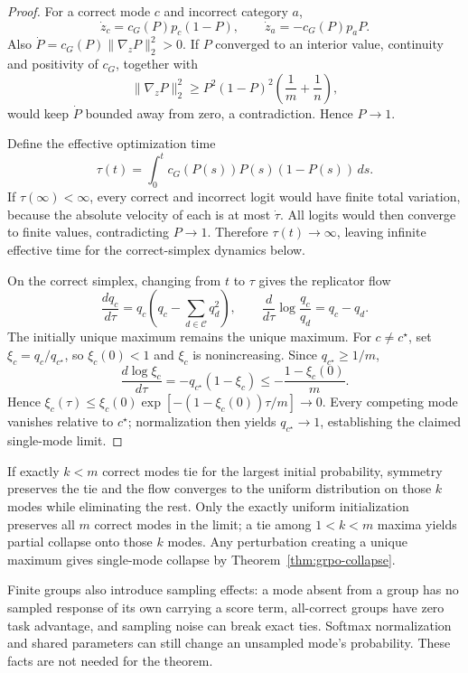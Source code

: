 \begin{proof}
For a correct mode $c$ and incorrect category $a$,
\[
  \dot z_c=c_G(P)p_c(1-P),
  \qquad
  \dot z_a=-c_G(P)p_aP.
\]
Also $\dot P=c_G(P)\lVert\nabla_zP\rVert_2^2>0$. If $P$ converged to an
interior value, continuity and positivity of $c_G$, together with
\[
 \lVert\nabla_zP\rVert_2^2
 \ge P^2(1-P)^2\left(\frac1m+\frac1n\right),
\]
would keep $\dot P$ bounded away from zero, a contradiction. Hence $P\to1$.

Define the effective optimization time
\[
  \tau(t)=\int_0^t c_G(P(s))P(s)(1-P(s))\,ds.
\]
If $\tau(\infty)<\infty$, every correct and incorrect logit would have finite
total variation, because the absolute velocity of each is at most $\dot\tau$.
All logits would then converge to finite values, contradicting $P\to1$.
Therefore $\tau(t)\to\infty$, leaving infinite effective time for the
correct-simplex dynamics below.

On the correct simplex, changing from $t$ to $\tau$ gives the replicator flow
\begin{equation}
  \frac{dq_c}{d\tau}
  =q_c\left(q_c-\sum_{d\in\mathcal C}q_d^2\right),
  \qquad
  \frac{d}{d\tau}\log\frac{q_c}{q_d}=q_c-q_d.
  \label{eq:grpo-replicator}
\end{equation}
The initially unique maximum remains the unique maximum. For $c\ne c^\star$,
set $\xi_c=q_c/q_{c^\star}$, so $\xi_c(0)<1$ and $\xi_c$ is nonincreasing.
Since $q_{c^\star}\ge1/m$,
\[
 \frac{d\log\xi_c}{d\tau}
 =-q_{c^\star}(1-\xi_c)
 \le-\frac{1-\xi_c(0)}{m}.
\]
Hence $\xi_c(\tau)\le\xi_c(0)\exp[-(1-\xi_c(0))\tau/m]\to0$.
Every competing mode vanishes relative to $c^\star$; normalization then
yields $q_{c^\star}\to1$, establishing the claimed single-mode limit.
\end{proof}

\begin{corollary}
\label{cor:grpo-ties}
If exactly $k<m$ correct modes tie for the largest initial probability, symmetry
preserves the tie and the flow converges to the uniform distribution on those
$k$ modes while eliminating the rest. Only the exactly uniform initialization preserves all $m$ correct modes
in the limit; a tie among $1<k<m$ maxima yields partial collapse onto those
$k$ modes. Any perturbation creating a unique maximum gives single-mode
collapse by Theorem~\ref{thm:grpo-collapse}.
\end{corollary}

Finite groups also introduce sampling effects: a mode absent from
a group has no sampled response of its own carrying a score term,
all-correct groups have zero task advantage, and sampling noise can break exact
ties. Softmax normalization and shared parameters can still change an
unsampled mode's probability. These facts are not needed for
the theorem.

